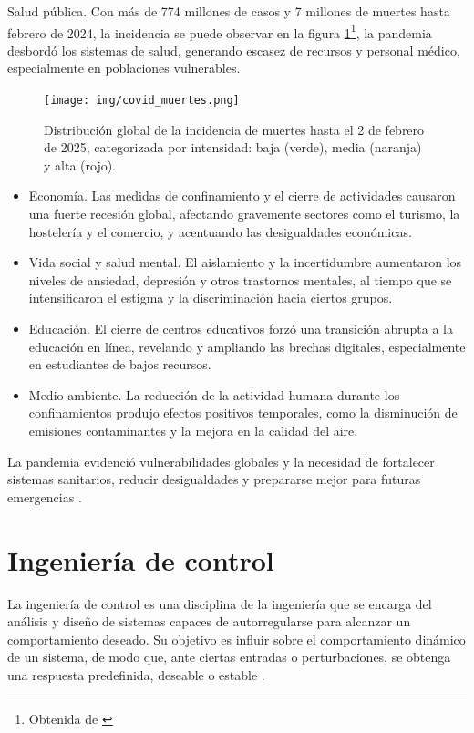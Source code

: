 Salud pública. Con más de 774 millones de casos y 7 millones de muertes hasta febrero de 2024, la incidencia se puede observar en la figura \ref{fig:muertes covid}\footnote{Obtenida de \cite{elpais_covidmap}}, la pandemia desbordó los sistemas de salud, generando escasez de recursos y personal médico, especialmente en poblaciones vulnerables.
\begin{figure}[H]
        \centering
        \texttt{[image: img/covid\_muertes.png]}
        \caption{Distribución global de la incidencia de muertes hasta el 2 de febrero de 2025, categorizada por intensidad: baja (verde), media (naranja) y alta (rojo).}
        \label{fig:muertes covid}
        \vspace{0.5cm} %
\end{figure}
\begin{itemize}
    \item Economía. Las medidas de confinamiento y el cierre de actividades causaron una fuerte recesión global, afectando gravemente sectores como el turismo, la hostelería y el comercio, y acentuando las desigualdades económicas.
    \item Vida social y salud mental. El aislamiento y la incertidumbre aumentaron los niveles de ansiedad, depresión y otros trastornos mentales, al tiempo que se intensificaron el estigma y la discriminación hacia ciertos grupos.
    \item Educación. El cierre de centros educativos forzó una transición abrupta a la educación en línea, revelando y ampliando las brechas digitales, especialmente en estudiantes de bajos recursos.
    \item Medio ambiente. La reducción de la actividad humana durante los confinamientos produjo efectos positivos temporales, como la disminución de emisiones contaminantes y la mejora en la calidad del aire.
\end{itemize}

La pandemia evidenció vulnerabilidades globales y la necesidad de fortalecer sistemas sanitarios, reducir desigualdades y prepararse mejor para futuras emergencias \cite{miyah2022covid}.

\section{Ingeniería de control}
La ingeniería de control es una disciplina de la ingeniería que se encarga del análisis y diseño de sistemas capaces de autorregularse para alcanzar un comportamiento deseado. Su objetivo es influir sobre el comportamiento dinámico de un sistema, de modo que, ante ciertas entradas o perturbaciones, se obtenga una respuesta predefinida, deseable o estable \cite{tme_ingenieria_control}.


